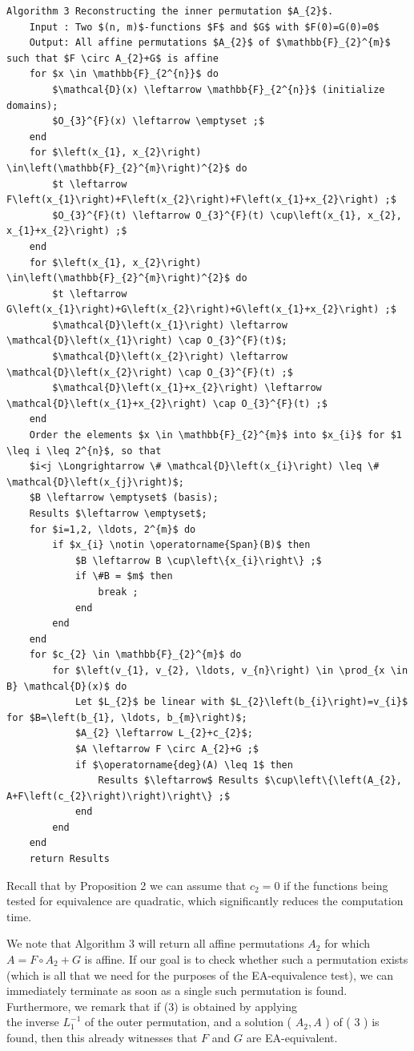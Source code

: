 \documentclass[10pt]{article}
\begin{document}
\begin{verbatim}
Algorithm 3 Reconstructing the inner permutation $A_{2}$.
    Input : Two $(n, m)$-functions $F$ and $G$ with $F(0)=G(0)=0$
    Output: All affine permutations $A_{2}$ of $\mathbb{F}_{2}^{m}$ such that $F \circ A_{2}+G$ is affine
    for $x \in \mathbb{F}_{2^{n}}$ do
        $\mathcal{D}(x) \leftarrow \mathbb{F}_{2^{n}}$ (initialize domains);
        $O_{3}^{F}(x) \leftarrow \emptyset ;$
    end
    for $\left(x_{1}, x_{2}\right) \in\left(\mathbb{F}_{2}^{m}\right)^{2}$ do
        $t \leftarrow F\left(x_{1}\right)+F\left(x_{2}\right)+F\left(x_{1}+x_{2}\right) ;$
        $O_{3}^{F}(t) \leftarrow O_{3}^{F}(t) \cup\left(x_{1}, x_{2}, x_{1}+x_{2}\right) ;$
    end
    for $\left(x_{1}, x_{2}\right) \in\left(\mathbb{F}_{2}^{m}\right)^{2}$ do
        $t \leftarrow G\left(x_{1}\right)+G\left(x_{2}\right)+G\left(x_{1}+x_{2}\right) ;$
        $\mathcal{D}\left(x_{1}\right) \leftarrow \mathcal{D}\left(x_{1}\right) \cap O_{3}^{F}(t)$;
        $\mathcal{D}\left(x_{2}\right) \leftarrow \mathcal{D}\left(x_{2}\right) \cap O_{3}^{F}(t) ;$
        $\mathcal{D}\left(x_{1}+x_{2}\right) \leftarrow \mathcal{D}\left(x_{1}+x_{2}\right) \cap O_{3}^{F}(t) ;$
    end
    Order the elements $x \in \mathbb{F}_{2}^{m}$ into $x_{i}$ for $1 \leq i \leq 2^{n}$, so that
    $i<j \Longrightarrow \# \mathcal{D}\left(x_{i}\right) \leq \# \mathcal{D}\left(x_{j}\right)$;
    $B \leftarrow \emptyset$ (basis);
    Results $\leftarrow \emptyset$;
    for $i=1,2, \ldots, 2^{m}$ do
        if $x_{i} \notin \operatorname{Span}(B)$ then
            $B \leftarrow B \cup\left\{x_{i}\right\} ;$
            if \#B = $m$ then
                break ;
            end
        end
    end
    for $c_{2} \in \mathbb{F}_{2}^{m}$ do
        for $\left(v_{1}, v_{2}, \ldots, v_{n}\right) \in \prod_{x \in B} \mathcal{D}(x)$ do
            Let $L_{2}$ be linear with $L_{2}\left(b_{i}\right)=v_{i}$ for $B=\left(b_{1}, \ldots, b_{m}\right)$;
            $A_{2} \leftarrow L_{2}+c_{2}$;
            $A \leftarrow F \circ A_{2}+G ;$
            if $\operatorname{deg}(A) \leq 1$ then
                Results $\leftarrow$ Results $\cup\left\{\left(A_{2}, A+F\left(c_{2}\right)\right)\right\} ;$
            end
        end
    end
    return Results
\end{verbatim}

Recall that by Proposition 2 we can assume that $c_{2}=0$ if the functions being tested for equivalence are quadratic, which significantly reduces the computation time.

We note that Algorithm 3 will return all affine permutations $A_{2}$ for which $A=F \circ A_{2}+G$ is affine. If our goal is to check whether such a permutation exists (which is all that we need for the purposes of the EA-equivalence test), we can immediately terminate as soon as a single such permutation is found. Furthermore, we remark that if (3) is obtained by applying\\
the inverse $L_{1}^{-1}$ of the outer permutation, and a solution ( $A_{2}, A$ ) of ( 3 ) is found, then this already witnesses that $F$ and $G$ are EA-equivalent.
\end{document}
